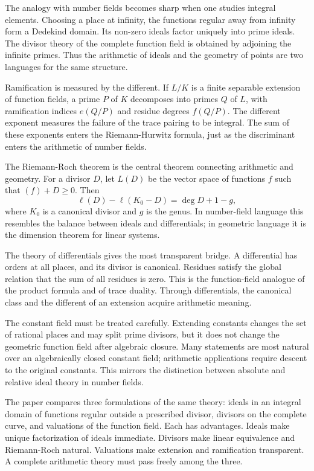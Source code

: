\documentclass[12pt]{article}
\begin{document}
The analogy with number fields becomes sharp when one studies integral elements. Choosing a place at
infinity, the functions regular away from infinity form a Dedekind domain. Its non-zero ideals
factor uniquely into prime ideals. The divisor theory of the complete function field is obtained by
adjoining the infinite primes. Thus the arithmetic of ideals and the geometry of points are two
languages for the same structure.


Ramification is measured by the different. If \(L/K\) is a finite separable extension of function
fields, a prime \(P\) of \(K\) decomposes into primes \(Q\) of \(L\), with ramification indices
\(e(Q/P)\) and residue degrees \(f(Q/P)\). The different exponent measures the failure of the trace
pairing to be integral. The sum of these exponents enters the Riemann-Hurwitz formula, just as the
discriminant enters the arithmetic of number fields.


The Riemann-Roch theorem is the central theorem connecting arithmetic and geometry. For a divisor
\(D\), let \(L(D)\) be the vector space of functions \(f\) such that \((f)+D\geq 0\). Then \[
\ell(D)-\ell(K_0-D)=\deg D+1-g, \] where \(K_0\) is a canonical divisor and \(g\) is the genus. In
number-field language this resembles the balance between ideals and differentials; in geometric
language it is the dimension theorem for linear systems.


The theory of differentials gives the most transparent bridge. A differential has orders at all
places, and its divisor is canonical. Residues satisfy the global relation that the sum of all
residues is zero. This is the function-field analogue of the product formula and of trace duality.
Through differentials, the canonical class and the different of an extension acquire arithmetic
meaning.


The constant field must be treated carefully. Extending constants changes the set of rational places
and may split prime divisors, but it does not change the geometric function field after algebraic
closure. Many statements are most natural over an algebraically closed constant field; arithmetic
applications require descent to the original constants. This mirrors the distinction between
absolute and relative ideal theory in number fields.


The paper compares three formulations of the same theory: ideals in an integral domain of functions
regular outside a prescribed divisor, divisors on the complete curve, and valuations of the function
field. Each has advantages. Ideals make unique factorization of ideals immediate. Divisors make
linear equivalence and Riemann-Roch natural. Valuations make extension and ramification transparent.
A complete arithmetic theory must pass freely among the three.
\end{document}
